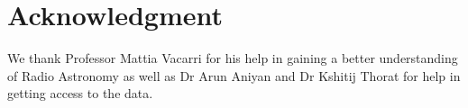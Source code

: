 \documentclass[conference]{IEEEtran}
\begin{document}
\section*{Acknowledgment}

We thank Professor Mattia Vacarri for his help in gaining a better understanding of Radio Astronomy as well as Dr Arun Aniyan and Dr Kshitij Thorat for help in getting access to the data.




\end{document}
